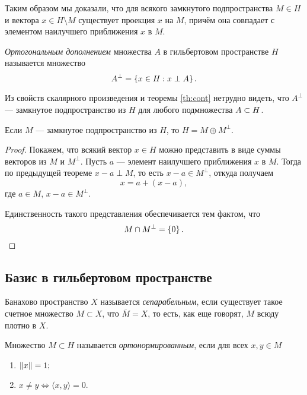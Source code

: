 Таким образом мы доказали, что для всякого замкнутого подпространства $M \in H$
и вектора $x \in H\setminus M$ существует проекция $x$ на $M$, причём она совпадает с
элементом наилучшего приближения $x$ в $M$.

\begin{definition}
    \emph{Ортогональным дополнением} множества $A$ в гильбертовом пространстве $H$ называется множество
    \[ A^\perp = \left\{x \in H : x \perp A\right\}. \]
\end{definition}

Из свойств скалярного произведения и теоремы \ref{th:cont} нетрудно видеть, 
что $A^\perp$ --- замкнутое подпространство из $H$ для любого
подмножества $A \hm\subset H$.

\begin{theorem}
    Если $M$ --- замкнутое подпространство из $H$, то $H = M \oplus M^\perp$.
\end{theorem}

\begin{proof}
    Покажем, что всякий вектор $x \in H$ можно представить в виде суммы векторов
    из $M$ и $M^\perp$. Пусть $a$ --- элемент наилучшего приближения $x$ в $M$.
    Тогда по предыдущей теореме $x - a \perp M$, то есть $x - a \in M^\perp$,
    откуда получаем
    \[ x = a + (x - a), \]
    где $a \in M$, $x - a \in M^\perp$.

    Единственность такого представления обеспечивается тем фактом, что
    \[ M \cap M^\perp = \left\{0\right\}. \]
\end{proof}

\subsection{Базис в гильбертовом пространстве}

\begin{definition}
    Банахово пространство $X$ называется \emph{сепарабельным}, если существует такое
    счетное множество $M \subset X$, что $\overline{M} = X$, то есть, как еще говорят, $M$
    всюду плотно в $X$.
\end{definition}

\begin{definition}
    Множество $M \subset H$ называется \emph{ортонормированным}, если для всех $x, y \in M$
    \begin{enumerate}
        \item $ \left\|x\right\| = 1; $
        \item $ x \neq y \Leftrightarrow \langle x, y \rangle = 0. $
    \end{enumerate}
\end{definition}

